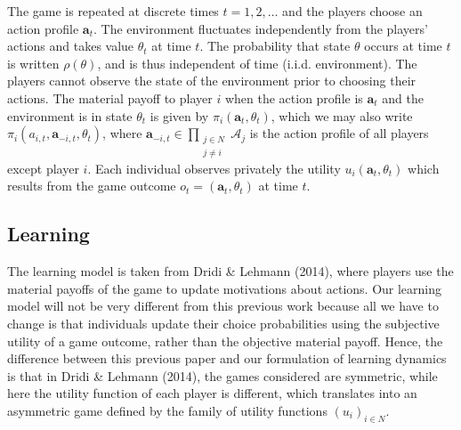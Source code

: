 \documentclass[11pt,reqno]{amsart}
\newcommand{\st}{\rho} %
\newcommand{\e}{\theta} %
\newcommand{\ac}{a} %
\newcommand{\Ac}{\mathcal{A}} %
\newcommand{\va}{\mathbf{a}} %
\newcommand{\pay}{\pi} %
\newcommand{\np}{N}%
\newcommand{\tm}{t}%
\newcommand{\om}{o} %
\newcommand{\pf}{u} %
\begin{document}
The game is repeated at discrete times $\tm = 1,2,\dots$ and the players choose an action profile $\va_\tm$. The environment fluctuates independently from the players' actions and takes value $\e_\tm$ at time $\tm$. The probability that state $\e$ occurs at time $\tm$ is written $\st(\e)$, and is thus independent of time (i.i.d. environment). The players cannot observe the state of the environment prior to choosing their actions. The material payoff to player $i$ when the action profile is $\va_\tm$ and the environment is in state $\e_\tm$ is given by $\pay_i(\va_\tm,\e_\tm)$, which we may also write $\pay_i(\ac_{i,t}, \va_{-i,t},\e_\tm)$, where $\va_{-i,t} \in \prod_{\substack{j\in \np \\ j\neq i}} \Ac_j$ is the action profile of all players except player $i$. Each individual observes privately the utility $\pf_i(\va_\tm,\e_\tm)$ which results from the game outcome $\om_\tm = (\va_\tm,\e_\tm)$ at time $\tm$.



\subsection{Learning}

The learning model is taken from Dridi \& Lehmann (2014), where players use the material payoffs of the game to update motivations about actions. Our learning model will not be very different from this previous work because all we have to change is that individuals update their choice probabilities using the subjective utility of a game outcome, rather than the objective material payoff. Hence, the difference between this previous paper and our formulation of learning dynamics is that in Dridi \& Lehmann (2014), the games considered are symmetric, while here the utility function of each player is different, which translates into an asymmetric game defined by the family of utility functions $(\pf_i)_{i\in \np}$.
\end{document}
